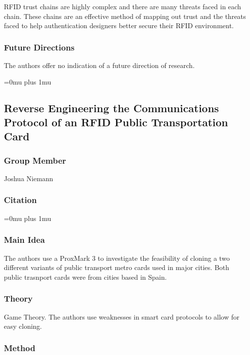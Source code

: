 \noindent
RFID trust chains are highly complex and there are many threats faced in each chain. These chains are an effective method of mapping out trust and the threats faced to help authentication designers better secure their RFID environment. 

\subsubsection{Future Directions}

\noindent
The authors offer no indication of a future direction of research. 

\Urlmuskip=0mu plus 1mu\relax

\noindent
\subsection{{R}everse {E}ngineering the {C}ommunications {P}rotocol of an {RFID} {P}ublic {T}ransportation {C}ard}

\subsubsection{Group Member}

\noindent
Joshua Niemann

\noindent
\subsubsection{Citation}

\Urlmuskip=0mu plus 1mu\relax

\subsubsection{Main Idea}

\noindent
The authors use a ProxMark 3 to investigate the feasibility of cloning a two different variants of public transport metro cards used in major cities.  Both public trasnport cards were from cities based in Spain.

\subsubsection{Theory}

\noindent
Game Theory.  The authors use weaknesses in smart card protocols to allow for easy cloning.

\subsubsection{Method}


